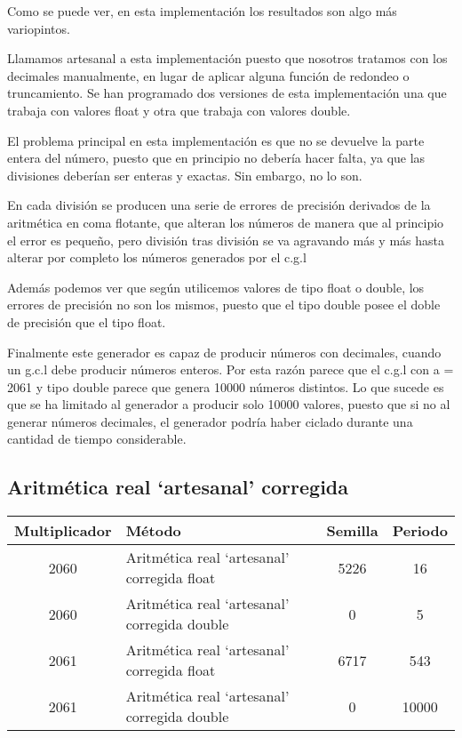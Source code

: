 Como se puede ver, en esta implementación los resultados son algo más variopintos.

Llamamos artesanal a esta implementación puesto que nosotros tratamos con los decimales manualmente, en lugar de aplicar alguna función de redondeo o truncamiento. Se han programado dos versiones de esta implementación una que trabaja con valores float y otra que trabaja con valores double.

El problema principal en esta implementación es que no se devuelve la parte entera del número, puesto que en principio no debería hacer falta, ya que las divisiones deberían ser enteras y exactas. Sin embargo, no lo son.

En cada división se producen una serie de errores de precisión derivados de la aritmética en coma flotante, que alteran los números de manera que al principio el error es pequeño, pero división tras división se va agravando más y más hasta alterar por completo los números generados por el c.g.l

Además podemos ver que según utilicemos valores de tipo float o double, los errores de precisión no son los mismos, puesto que el tipo double posee el doble de precisión que el tipo float.

Finalmente este generador es capaz de producir números con decimales, cuando un g.c.l debe producir números enteros. Por esta razón parece que el c.g.l con a = 2061 y tipo double parece que genera 10000 números distintos. Lo que sucede es que se ha limitado al generador a producir solo 10000 valores, puesto que si no al generar números decimales, el generador podría haber ciclado durante una cantidad de tiempo considerable.

\subsection{Aritmética real `artesanal' corregida}
\begin{table}[H]
\centering
\begin{tabular}{|c|l|c|c|}
\hline
\textbf{Multiplicador} & \textbf{Método} & \textbf{Semilla} & \textbf{Periodo} \\ \hline
2060 & Aritmética real `artesanal' corregida float & 5226 & 16 \\
2060 & Aritmética real `artesanal' corregida double & 0 & 5 \\
2061 & Aritmética real `artesanal' corregida float & 6717 & 543 \\
2061 & Aritmética real `artesanal' corregida double & 0 & 10000 \\ \hline
\end{tabular}
\end{table}

